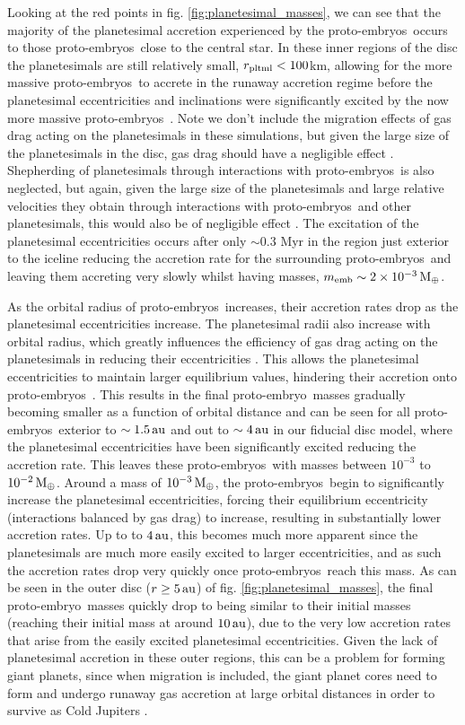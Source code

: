 \documentclass[a4paper,fleqn,usenatbib]{mnras}
\newcommand{\me}{{\, {\rm M}_{\oplus}}}
\newcommand{\au}{{\, {\rm au}}}
\newcommand{\emb}{{{proto-embryo~}}}
\newcommand{\embs}{{{proto-embryos~}}}
\begin{document}
Looking at the red points in fig. \ref{fig:planetesimal_masses}, we can see that the majority of the planetesimal accretion experienced by the \embs occurs to those \embs close to the central star.
In these inner regions of the disc the planetesimals are still relatively small, $r_{\rm pltml} < 100$km, allowing for the more massive \embs to accrete in the runaway accretion regime before the planetesimal eccentricities and inclinations were significantly excited by the now more massive \embs.
Note we don't include the migration effects of gas drag acting on the planetesimals in these simulations, but given the large size of the planetesimals in the disc, gas drag should have a negligible effect \citep{Adachi,Weidenschilling_77}.
Shepherding of planetesimals through interactions with \embs is also neglected, but again, given the large size of the planetesimals and large relative velocities they obtain through interactions with \embs and other planetesimals, this would also be of negligible effect \citep{ColemanNelson16}.
The excitation of the planetesimal eccentricities occurs after only $\sim 0.3$ Myr in the region just exterior to the iceline reducing the accretion rate for the surrounding \embs and leaving them accreting very slowly whilst having masses, $m_{\rm emb} \sim 2\times10^{-3}\me$.

As the orbital radius of \embs increases, their accretion rates drop as the planetesimal eccentricities increase.
The planetesimal radii also increase with orbital radius, which greatly influences the efficiency of gas drag acting on the planetesimals in reducing their eccentricities \citep[see eqs. 31-41 of ][]{Fortier13}.
This allows the planetesimal eccentricities to maintain larger equilibrium values, hindering their accretion onto \embs.
This results in the final \emb masses gradually becoming smaller as a function of orbital distance and can be seen for all \embs exterior to $\sim1.5 \au$ and out to $\sim 4\au$ in our fiducial disc model, where the planetesimal eccentricities have been significantly excited reducing the accretion rate.
This leaves these \embs with masses between $10^{-3}$ to $10^{-2}\me$.
Around a mass of $10^{-3}\me$, the \embs begin to significantly increase the planetesimal eccentricities, forcing their equilibrium eccentricity (interactions balanced by gas drag) to increase, resulting in substantially lower accretion rates.
Up to to $4\au$, this becomes much more apparent since the planetesimals are much more easily excited to larger eccentricities, and as such the accretion rates drop very quickly once \embs reach this mass.
As can be seen in the outer disc ($r\ge 5 \au$) of fig. \ref{fig:planetesimal_masses}, the final \emb masses quickly drop to being similar to their initial masses (reaching their initial mass at around $10\au$), due to the very low accretion rates that arise from the easily excited planetesimal eccentricities.
Given the lack of planetesimal accretion in these outer regions, this can be a problem for forming giant planets, since when migration is included, the giant planet cores need to form and undergo runaway gas accretion at large orbital distances in order to survive as Cold Jupiters \citep[$r_{\rm p}>1\au$,][]{ColemanNelson14,ColemanNelson16b}.
\end{document}
